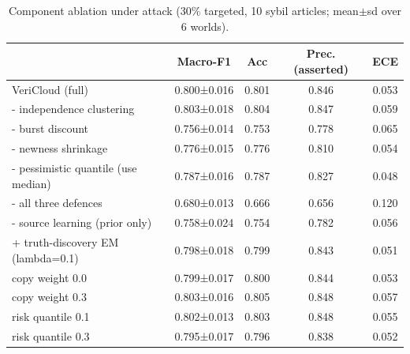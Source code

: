 \begin{table}[t]
\centering
\caption{Component ablation under attack (30\% targeted, 10 sybil articles; mean$\pm$sd over 6 worlds).}
\label{tab:ablation}
\small
\begin{tabular}{lcccc}
\toprule
 & Macro-F1 & Acc & Prec. (asserted) & ECE \\
\midrule
VeriCloud (full) & 0.800±0.016 & 0.801 & 0.846 & 0.053 \\
- independence clustering & 0.803±0.018 & 0.804 & 0.847 & 0.059 \\
- burst discount & 0.756±0.014 & 0.753 & 0.778 & 0.065 \\
- newness shrinkage & 0.776±0.015 & 0.776 & 0.810 & 0.054 \\
- pessimistic quantile (use median) & 0.787±0.016 & 0.787 & 0.827 & 0.048 \\
- all three defences & 0.680±0.013 & 0.666 & 0.656 & 0.120 \\
- source learning (prior only) & 0.758±0.024 & 0.754 & 0.782 & 0.056 \\
+ truth-discovery EM (lambda=0.1) & 0.798±0.018 & 0.799 & 0.843 & 0.051 \\
copy weight 0.0 & 0.799±0.017 & 0.800 & 0.844 & 0.053 \\
copy weight 0.3 & 0.803±0.016 & 0.805 & 0.848 & 0.057 \\
risk quantile 0.1 & 0.802±0.013 & 0.803 & 0.848 & 0.055 \\
risk quantile 0.3 & 0.795±0.017 & 0.796 & 0.838 & 0.052 \\
\bottomrule
\end{tabular}
\end{table}

